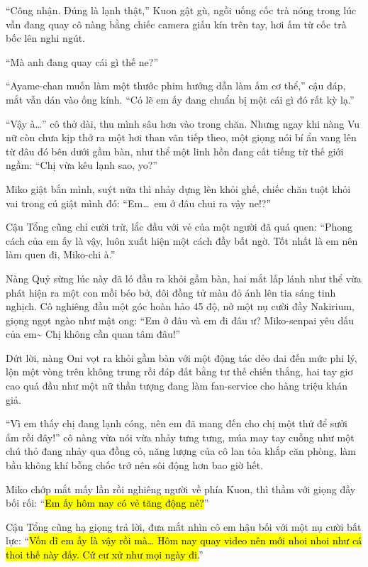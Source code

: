 \documentclass[../main.tex]{subfiles}
\begin{document}
``Công nhận. Đúng là lạnh thật,'' Kuon gật gù, ngồi uống cốc trà nóng trong lúc vẫn đang quay cô nàng bằng chiếc camera giấu kín trên tay, hơi ấm từ cốc trà bốc lên nghi ngút.

``Mà anh đang quay cái gì thế ne?''

``Ayame-chan muốn làm một thước phim hướng dẫn làm ấm cơ thể,'' cậu đáp, mắt vẫn dán vào ống kính. ``Có lẽ em ấy đang chuẩn bị một cái gì đó rất kỳ lạ.''

``Vậy à\dots'' cô thở dài, thu mình sâu hơn vào trong chăn. Nhưng ngay khi nàng Vu nữ còn chưa kịp thở ra một hơi than vãn tiếp theo, một giọng nói bí ẩn vang lên từ đâu đó bên dưới gầm bàn, như thể một linh hồn đang cất tiếng từ thế giới ngầm: ``Chị vừa kêu lạnh sao, yo?''


Miko giật bắn mình, suýt nữa thì nhảy dựng lên khỏi ghế, chiếc chăn tuột khỏi vai trong cú giật mình đó: ``Em\dots\ em ở đâu chui ra vậy ne!?''

Cậu Tổng cũng chỉ cười trừ, lắc đầu với vẻ của một người đã quá quen: ``Phong cách của em ấy là vậy, luôn xuất hiện một cách đầy bất ngờ. Tốt nhất là em nên làm quen đi, Miko-chi à.''

Nàng Quỷ sừng lúc này đã ló đầu ra khỏi gầm bàn, hai mắt lấp lánh như thể vừa phát hiện ra một con mồi béo bở, đôi đồng tử màu đỏ ánh lên tia sáng tinh nghịch. Cô nghiêng đầu một góc hoàn hảo 45 độ, nở một nụ cười đầy Nakirium, giọng ngọt ngào như mật ong: ``Em ở đâu và em đi đâu ư? Miko-senpai yêu dấu của em\~{} Chị không cần quan tâm đâu!''

Dứt lời, nàng Oni vọt ra khỏi gầm bàn với một động tác dẻo dai đến mức phi lý, lộn một vòng trên không trung rồi đáp đất bằng tư thế chiến thắng, hai tay giơ cao quá đầu như một nữ thần tượng đang làm fan-service cho hàng triệu khán giả.

``Vì em thấy chị đang lạnh cóng, nên em đã mang đến cho chị một thứ để sưởi ấm rồi đây!'' cô nàng vừa nói vừa nhảy tưng tưng, múa may tay cuồng như một chú thỏ đang nhảy qua đồng cỏ, năng lượng của cô lan tỏa khắp căn phòng, làm bầu không khí bỗng chốc trở nên sôi động hơn bao giờ hết.


Miko chớp mắt mấy lần rồi nghiêng người về phía Kuon, thì thầm với giọng đầy bối rối: ``\hl{Em ấy hôm nay có vẻ tăng động nẻ?}''

Cậu Tổng cũng hạ giọng trả lời, đưa mắt nhìn cô em hậu bối với một nụ cười bất lực: ``\hl{Vốn dĩ em ấy là vậy rồi mà\dots{} Hôm nay quay video nên mới nhoi nhoi như cá thoi thế này đấy. Cứ cư xử như mọi ngày đi.}''
\end{document}
